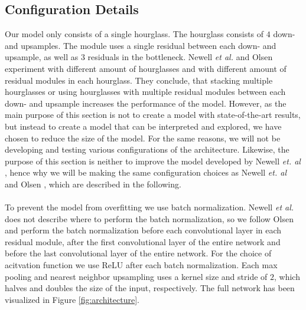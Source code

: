 \documentclass[./main.tex]{subfiles}
\begin{document}
\subsection{Configuration Details}\label{subsec:conf_details}
Our model only consists of a single hourglass. The hourglass consists of $4$ down- and upsamples. The module uses a single residual between each down- and upsample, as well as $3$ residuals in the bottleneck. Newell \textit{et al.} \cite{Newell} and Olsen \cite{Camilla} experiment with different amount of hourglasses and with different amount of residual modules in each hourglass. They conclude, that stacking multiple hourglasses or using hourglasses with multiple residual modules between each down- and upsample increases the performance of the model. However, as the main purpose of this section is not to create a model with state-of-the-art results, but instead to create a model that can be interpreted and explored, we have chosen to reduce the size of the model. For the same reasons, we will not be developing and testing various configurations of the architecture. Likewise, the purpose of this section is neither to improve the model developed by Newell \textit{et. al} \cite{Newell}, hence why we will be making the same configuration choices as Newell \textit{et. al} \cite{Newell} and Olsen \cite{Camilla}, which are described in the following.
\\
\\
To prevent the model from overfitting we use batch normalization. Newell \textit{et al.} \cite{Newell} does not describe where to perform the batch normalization, so we follow Olsen \cite{Camilla} and perform the batch normalization before each convolutional layer in each residual module, after the first convolutional layer of the entire network and before the last convolutional layer of the entire network. For the choice of acitvation function we use ReLU after each batch normalization. Each max pooling and nearest neighbor upsampling uses a kernel size and stride of $2$, which halves and doubles the size of the input, respectively. The full network has been visualized in Figure \ref{fig:architecture}.
\\
\end{document}
